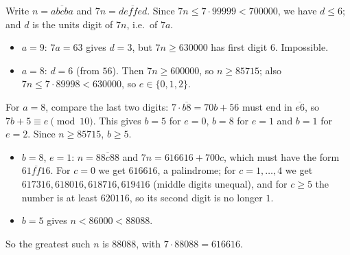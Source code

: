 Write $n=\overline{abcba}$ and $7n=\overline{deffed}$. Since $7n\le7\cdot99999<700000$, we have $d\le6$; and $d$ is the units digit of $7n$, i.e.\ of $7a$.
\begin{itemize}
\item $a=9$: $7a=63$ gives $d=3$, but $7n\ge630000$ has first digit $6$. Impossible.
\item $a=8$: $d=6$ (from $56$). Then $7n\ge600000$, so $n\ge85715$; also $7n\le7\cdot89998<630000$, so $e\in\{0,1,2\}$.
\end{itemize}
For $a=8$, compare the last two digits: $7\cdot\overline{b8}=70b+56$ must end in $\overline{e6}$, so $7b+5\equiv e\pmod{10}$. This gives $b=5$ for $e=0$, $b=8$ for $e=1$ and $b=1$ for $e=2$. Since $n\ge85715$, $b\ge5$.

\begin{itemize}
\item $b=8$, $e=1$: $n=\overline{88c88}$ and $7n=616616+700c$, which must have the form $\overline{61ff16}$. For $c=0$ we get $616616$, a palindrome; for $c=1,\dots,4$ we get $617316,618016,618716,619416$ (middle digits unequal), and for $c\ge5$ the number is at least $620116$, so its second digit is no longer $1$.
\item $b=5$ gives $n<86000<88088$.
\end{itemize}
So the greatest such $n$ is $\boxed{88088}$, with $7\cdot88088=616616$.
